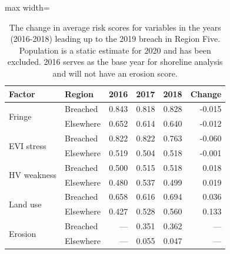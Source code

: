 \begin{table}[htbp]
\centering
\caption{The change in average risk scores for variables in the years (2016-2018) leading up 
to the 2019 breach in Region Five. Population 
is a static estimate for 2020 and has been excluded. 2016 serves as the base year 
for shoreline analysis and will not have an erosion score.} 
\label{tab:hindcast-pipeline-table}
\begin{adjustbox}{max width=\textwidth}
\begin{tabular}{llrrrr}
\toprule
Factor & Region & 2016 & 2017 & 2018 & Change \\
\midrule
\multirow[t]{2}{*}{Fringe} & Breached & 0.843 & 0.818 & 0.828 & -0.015 \\
 & Elsewhere & 0.652 & 0.614 & 0.640 & -0.012 \\
\multirow[t]{2}{*}{EVI stress} & Breached & 0.822 & 0.822 & 0.763 & -0.060 \\
 & Elsewhere & 0.519 & 0.504 & 0.518 & -0.001 \\
\multirow[t]{2}{*}{HV weakness} & Breached & 0.500 & 0.515 & 0.518 & 0.018 \\
 & Elsewhere & 0.480 & 0.537 & 0.499 & 0.019 \\
\multirow[t]{2}{*}{Land use} & Breached & 0.658 & 0.616 & 0.694 & 0.036 \\
 & Elsewhere & 0.427 & 0.528 & 0.560 & 0.133 \\
\multirow[t]{2}{*}{Erosion} & Breached & --- & 0.351 & 0.362 & --- \\
 & Elsewhere & --- & 0.055 & 0.047 & --- \\
\bottomrule
\end{tabular}
\end{adjustbox}
\end{table}